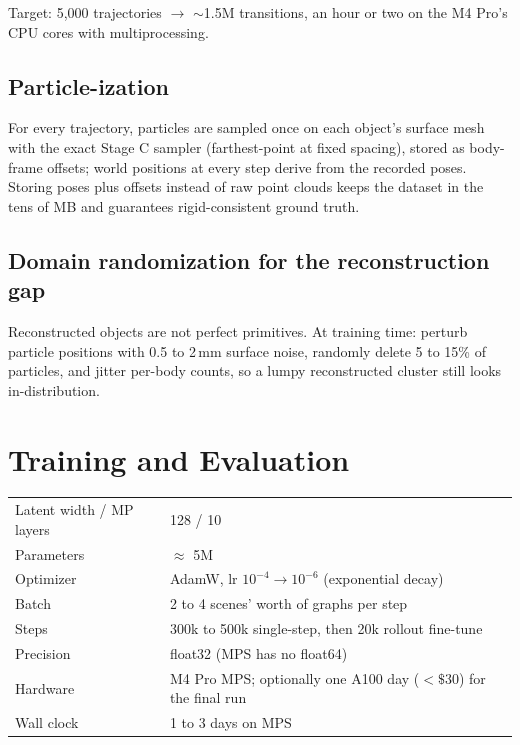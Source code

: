 \documentclass[11pt]{article}
\begin{document}
Target: 5{,}000 trajectories $\rightarrow$ $\sim$1.5M transitions, an hour or two on the M4 Pro's CPU cores with multiprocessing.

\subsection{Particle-ization}
For every trajectory, particles are sampled once on each object's surface mesh with the exact Stage C sampler (farthest-point at fixed spacing), stored as body-frame offsets; world positions at every step derive from the recorded poses. Storing poses plus offsets instead of raw point clouds keeps the dataset in the tens of MB and guarantees rigid-consistent ground truth.

\subsection{Domain randomization for the reconstruction gap}
Reconstructed objects are not perfect primitives. At training time: perturb particle positions with 0.5 to 2\,mm surface noise, randomly delete 5 to 15\% of particles, and jitter per-body counts, so a lumpy reconstructed cluster still looks in-distribution.

\section{Training and Evaluation}
\label{sec:training}

\begin{center}
\begin{tabular}{@{}ll@{}}
\toprule
Latent width / MP layers & 128 / 10 \\
Parameters & $\approx$ 5M \\
Optimizer & AdamW, lr $10^{-4} \rightarrow 10^{-6}$ (exponential decay) \\
Batch & 2 to 4 scenes' worth of graphs per step \\
Steps & 300k to 500k single-step, then 20k rollout fine-tune \\
Precision & float32 (MPS has no float64) \\
Hardware & M4 Pro MPS; optionally one A100 day ($<\$30$) for the final run \\
Wall clock & 1 to 3 days on MPS \\
\bottomrule
\end{tabular}
\end{center}
\end{document}
